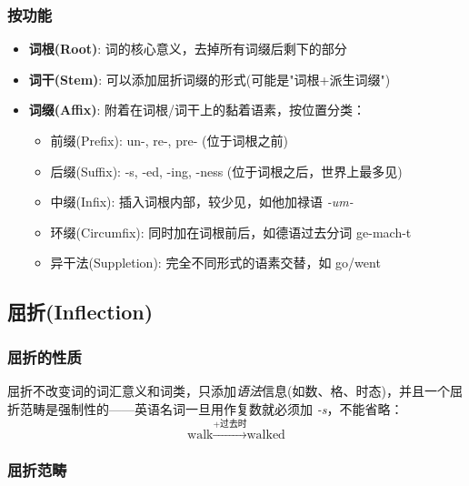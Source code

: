 \subsubsection{按功能}

\begin{itemize}
    \item \textbf{词根(Root)}: 词的核心意义，去掉所有词缀后剩下的部分
    \item \textbf{词干(Stem)}: 可以添加屈折词缀的形式(可能是"词根+派生词缀")
    \item \textbf{词缀(Affix)}: 附着在词根/词干上的黏着语素，按位置分类：
    \begin{itemize}
        \item 前缀(Prefix): un-, re-, pre- (位于词根之前)
        \item 后缀(Suffix): -s, -ed, -ing, -ness (位于词根之后，世界上最多见)
        \item 中缀(Infix): 插入词根内部，较少见，如他加禄语 \textit{-um-}
        \item 环缀(Circumfix): 同时加在词根前后，如德语过去分词 ge-mach-t
        \item 异干法(Suppletion): 完全不同形式的语素交替，如 go/went
    \end{itemize}
\end{itemize}

\subsection{屈折(Inflection)}

\subsubsection{屈折的性质}

屈折不改变词的词汇意义和词类，只添加\emph{语法}信息(如数、格、时态)，并且一个屈折范畴是强制性的——英语名词一旦用作复数就必须加 \emph{-s}，不能省略：
\begin{equation}
    \text{walk} \xrightarrow{+\text{过去时}} \text{walked}
\end{equation}

\subsubsection{屈折范畴}

